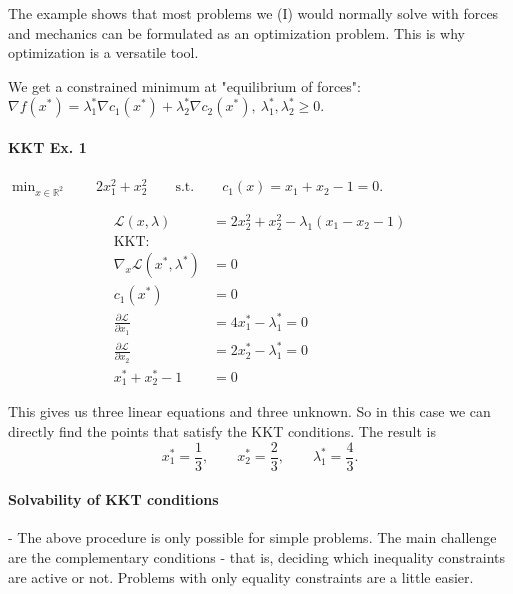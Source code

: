 \documentclass{article}
\begin{document}
The example shows that most problems we (I) would normally solve with forces and mechanics can be formulated as an
optimization problem. This is why optimization is a versatile tool.

We get a constrained minimum at "equilibrium of forces": $\nabla f(x^*) = \lambda_1^*\nabla c_1(x^*) + \lambda_2^*\nabla c_2(x^*),\ \lambda_1^*, \lambda_2^* \geq 0$.

\paragraph{KKT Ex. 1} $\min_{x\in \mathbb{R}^{2}} \qquad 2x_1^2 + x_2^2 \qquad \text{s.t.} \qquad c_1(x) = x_1 + x_2 - 1 = 0$.

\begin{minipage}[c]{0.5\textwidth}
\end{minipage}
\begin{minipage}[c]{0.5\textwidth}
  \begin{align*}
    \mathcal{L}(x, \lambda)                  & = 2x_2^2 + x_2^2 - \lambda_1(x_1-x_2-1) \\
    \text{KKT:}                              &                                         \\
    \nabla_{x}\mathcal{L}(x^*, \lambda ^*)   & = 0                                     \\
    c_1(x^*)                                 & = 0                                     \\
    \frac{\partial\mathcal{L}}{\partial x_1} & = 4x_1^*-\lambda_1^* = 0                \\
    \frac{\partial\mathcal{L}}{\partial x_2} & = 2x_2^* - \lambda_1^* = 0              \\
    x_1^* + x_2^* - 1                        & = 0
  \end{align*}
\end{minipage}

This gives us three linear equations and three unknown. So in this case we can directly find the points
that satisfy the KKT conditions. The result is
\[
  x_1^* = \frac{1}{3}, \qquad x_2^* = \frac{2}{3}, \qquad \lambda_1^* = \frac{4}{3}
  .\]

\paragraph{Solvability of KKT conditions} - The above procedure is only possible for simple problems. The main challenge are
the complementary conditions - that is, deciding which inequality constraints are active or not. Problems with
only equality constraints are a little easier.
\end{document}
